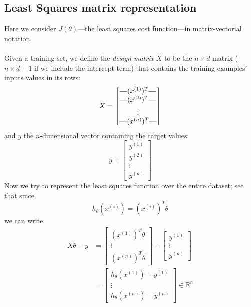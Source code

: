 \documentclass{report}
\newcommand*{\horzbar}{\rule[.5ex]{2.5ex}{0.5pt}} %
\begin{document}
\subsection{Least Squares matrix representation}
Here we consider $J(\theta)$---the least squares cost function---in matrix-vectorial notation.\\
\vspace{1mm}\\
Given a training set, we define the \textit{design matrix} $X$ to be the $n\times d$ matrix ($n\times d+1$ if we
include the intercept term) that contains the training examples' inputs values in its rows:
\begin{equation*}
X=\begin{bmatrix}
\horzbar(x^{(1)})^T\horzbar\\
\horzbar(x^{(2)})^T\horzbar\\
\vdots\\\horzbar(x^{(n)})^T\horzbar
\end{bmatrix}
\end{equation*}
and $y$ the $n$-dimensional vector containing the target values:
\begin{equation*}
y=\begin{bmatrix}
y^{(1)}\\y^{(2)}\\\vdots\\y^{(n)}
\end{bmatrix}
\end{equation*}
Now we try to represent the least squares function over the entire dataset; see that since 
\begin{equation*}
h_\theta(x^{(i)})=(x^{(i)})^T\theta
\end{equation*}
we can write
\begin{align*}
X\theta-y&=\begin{bmatrix}
(x^{(1)})^T\theta\\
\vdots\\(x^{(n)})^T\theta
\end{bmatrix}-
\begin{bmatrix}y^{(1)}\\\vdots\\y^{(n)}\end{bmatrix}\\
&=\begin{bmatrix}
h_\theta(x^{(1)})-y^{(1)}\\\vdots\\
h_\theta(x^{(n)})-y^{(n)}\end{bmatrix}\in\mathbb{R}^n
\end{align*}
\end{document}
